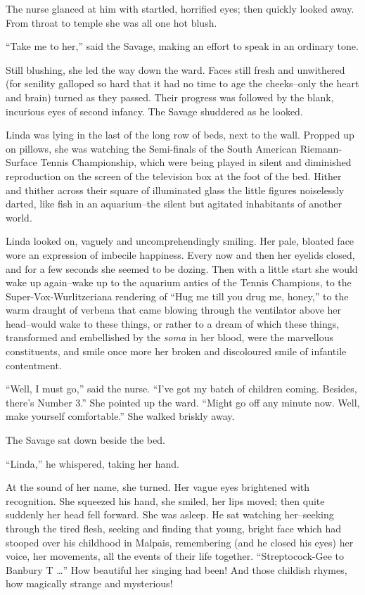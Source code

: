 \documentclass[12pt]{report}
\begin{document}
The nurse glanced at him with startled, horrified eyes; then quickly
looked away. From throat to temple she was all one hot blush.

``Take me to her,'' said the Savage, making an effort to speak in an
ordinary tone.

Still blushing, she led the way down the ward. Faces still fresh and
unwithered (for senility galloped so hard that it had no time to age the
cheeks--only the heart and brain) turned as they passed. Their progress
was followed by the blank, incurious eyes of second infancy. The Savage
shuddered as he looked.

Linda was lying in the last of the long row of beds, next to the wall.
Propped up on pillows, she was watching the Semi-finals of the South
American Riemann-Surface Tennis Championship, which were being played in
silent and diminished reproduction on the screen of the television box
at the foot of the bed. Hither and thither across their square of
illuminated glass the little figures noiselessly darted, like fish in an
aquarium--the silent but agitated inhabitants of another world.

Linda looked on, vaguely and uncomprehendingly smiling. Her pale,
bloated face wore an expression of imbecile happiness. Every now and
then her eyelids closed, and for a few seconds she seemed to be dozing.
Then with a little start she would wake up again--wake up to the
aquarium antics of the Tennis Champions, to the Super-Vox-Wurlitzeriana
rendering of ``Hug me till you drug me, honey,'' to the warm draught of
verbena that came blowing through the ventilator above her head--would
wake to these things, or rather to a dream of which these things,
transformed and embellished by the \emph{soma} in her blood, were the
marvellous constituents, and smile once more her broken and discoloured
smile of infantile contentment.

``Well, I must go,'' said the nurse. ``I've got my batch of children
coming. Besides, there's Number 3.'' She pointed up the ward. ``Might go
off any minute now. Well, make yourself comfortable.'' She walked
briskly away.

The Savage sat down beside the bed.

``Linda,'' he whispered, taking her hand.

At the sound of her name, she turned. Her vague eyes brightened with
recognition. She squeezed his hand, she smiled, her lips moved; then
quite suddenly her head fell forward. She was asleep. He sat watching
her--seeking through the tired flesh, seeking and finding that young,
bright face which had stooped over his childhood in Malpais, remembering
(and he closed his eyes) her voice, her movements, all the events of
their life together. ``Streptocock-Gee to Banbury T \ldots{}'' How
beautiful her singing had been! And those childish rhymes, how magically
strange and mysterious!
\end{document}
